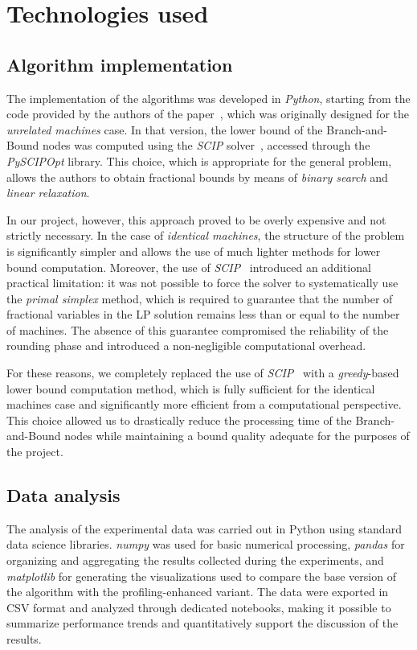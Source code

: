 \chapter{Technologies used}
\label{ch:technologies}

\section{Algorithm implementation}

The implementation of the algorithms was developed in \emph{Python}, starting from the code provided by the authors of the paper~\cite{bb-ptas}, which was originally designed for the \emph{unrelated machines} case.
In that version, the lower bound of the Branch-and-Bound nodes was computed using the \emph{SCIP} solver~\cite{scip}, accessed through the \emph{PySCIPOpt} library.
This choice, which is appropriate for the general problem, allows the authors to obtain fractional bounds by means of \emph{binary search} and \emph{linear relaxation}.

In our project, however, this approach proved to be overly expensive and not strictly necessary.
In the case of \emph{identical machines}, the structure of the problem is significantly simpler and allows the use of much lighter methods for lower bound computation.
Moreover, the use of \emph{SCIP}~\cite{scip} introduced an additional practical limitation: it was not possible to force the solver to systematically use the \emph{primal simplex} method, which is required to guarantee that the number of fractional variables in the LP solution remains less than or equal to the number of machines.
The absence of this guarantee compromised the reliability of the rounding phase and introduced a non-negligible computational overhead.

For these reasons, we completely replaced the use of \emph{SCIP}~\cite{scip} with a \emph{greedy}-based lower bound computation method, which is fully sufficient for the identical machines case and significantly more efficient from a computational perspective.
This choice allowed us to drastically reduce the processing time of the Branch-and-Bound nodes while maintaining a bound quality adequate for the purposes of the project.

\section{Data analysis}

The analysis of the experimental data was carried out in Python using standard data science libraries. \emph{numpy} was used for basic numerical processing, \emph{pandas} for organizing and aggregating the results collected during the experiments, and \emph{matplotlib} for generating the visualizations used to compare the base version of the algorithm with the profiling-enhanced variant.
The data were exported in CSV format and analyzed through dedicated notebooks, making it possible to summarize performance trends and quantitatively support the discussion of the results.
